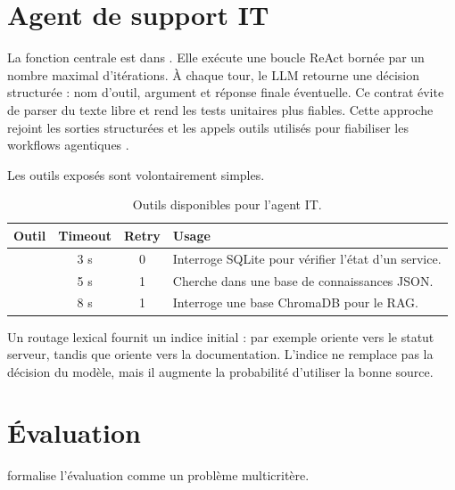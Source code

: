 \section{Agent de support IT}

La fonction centrale est  dans .
Elle exécute une boucle ReAct bornée par un nombre maximal d'itérations. À
chaque tour, le LLM retourne une décision structurée : nom d'outil, argument et
réponse finale éventuelle. Ce contrat évite de parser du texte libre et rend les
tests unitaires plus fiables. Cette approche rejoint les sorties structurées et
les appels outils utilisés pour fiabiliser les workflows agentiques
\cite{openaistructured2024}.


Les outils exposés sont volontairement simples.

\begin{table}[!htbp]
\centering
\begin{tabularx}{\textwidth}{lccY}
\toprule
\textbf{Outil} & \textbf{Timeout} & \textbf{Retry} & \textbf{Usage} \\
\midrule
{} & 3 s & 0 & Interroge SQLite pour vérifier l'état d'un service. \\
 & 5 s & 1 & Cherche dans une base de connaissances JSON. \\
 & 8 s & 1 & Interroge une base ChromaDB pour le RAG. \\
\bottomrule
\end{tabularx}
\caption{Outils disponibles pour l'agent IT.}
\label{tab:tools}
\end{table}

Un routage lexical fournit un indice initial : par exemple  oriente
vers le statut serveur, tandis que  oriente vers la
documentation. L'indice ne remplace pas la décision du modèle, mais il augmente
la probabilité d'utiliser la bonne source.

\section{Évaluation}

\bibopsname{} formalise l'évaluation comme un problème multicritère.

